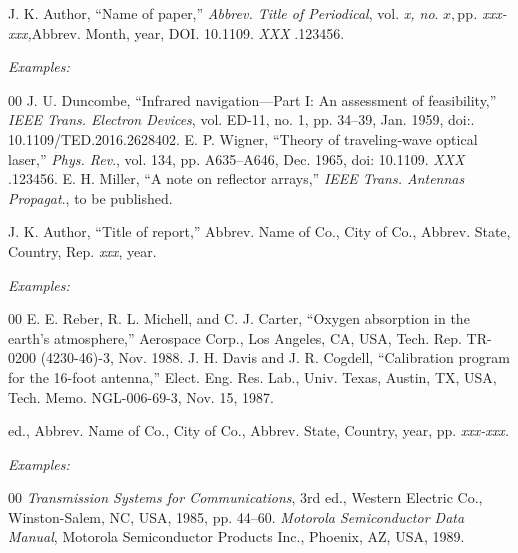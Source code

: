 \documentclass{ieeetmlcn}
\begin{document}

\noindent J. K. Author, ``Name of paper,'' {\it Abbrev. Title of Periodical}, vol. {\it x, no}. $x, $pp{\it . xxx-xxx,}Abbrev. Month, year, DOI.
 {10.1109.} {{\it XXX}} {.123456}.

{\it Examples:}

\begin{thebibliography}{00}
 J. U. Duncombe, ``Infrared navigation---Part I: An assessment of feasibility,'' {\it IEEE Trans. Electron Devices}, vol. ED-11, no. 1, pp. 34--39, Jan. 1959, doi:.  {10.1109/TED.2016.2628402}.
 E. P. Wigner, ``Theory of traveling-wave optical laser,''
{\it Phys. Rev}., vol. 134, pp. A635--A646, Dec. 1965, doi:  {10.1109.} {{\it XXX}} {.123456}.
 E. H. Miller, ``A note on reflector arrays,'' {\it IEEE Trans. Antennas Propagat}., to be published.
\end{thebibliography}


\noindent J. K. Author, ``Title of report,'' Abbrev. Name of Co., City of Co., Abbrev.
State, Country, Rep. {\it xxx}, year.

{\it Examples:}

\begin{thebibliography}{00}
 E. E. Reber, R. L. Michell, and C. J. Carter, ``Oxygen absorption in the earth's atmosphere,'' Aerospace Corp., Los Angeles, CA, USA, Tech. Rep. TR-0200 (4230-46)-3, Nov. 1988.
 J. H. Davis and J. R. Cogdell, ``Calibration program for the 16-foot antenna,'' Elect. Eng. Res. Lab., Univ. Texas, Austin, TX, USA, Tech. Memo. NGL-006-69-3, Nov. 15, 1987.
\end{thebibliography}


 ed., Abbrev. Name of Co., City of Co., Abbrev. State, Country, year, pp.
{\it xxx-xxx.}

{\it Examples:}

\begin{thebibliography}{00}
 {\it Transmission Systems for Communications}, 3rd ed., Western Electric Co., Winston-Salem, NC, USA, 1985, pp. 44--60.
 {\it Motorola Semiconductor Data Manual}, Motorola Semiconductor Products Inc., Phoenix, AZ, USA, 1989.
\end{thebibliography}
\end{document}
